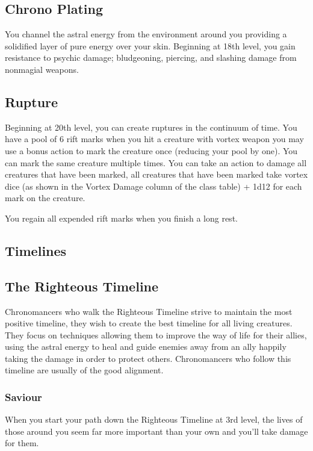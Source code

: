 \subsection{Chrono Plating}

You channel the astral energy from the environment around you providing a solidified layer of pure energy over your skin. Beginning at 18th level, you gain resistance to psychic damage; bludgeoning, piercing, and slashing damage from nonmagial weapons.

\subsection{Rupture}

Beginning at 20th level, you can create ruptures in the continuum of time. You have a pool of 6 rift marks when you hit a creature with vortex weapon you may use a bonus action to mark the creature once (reducing your pool by one). You can mark the same creature multiple times. You can take an action to damage all creatures that have been marked, all creatures that have been marked take vortex dice (as shown in the Vortex Damage column of the class table) + 1d12 for each mark on the creature.

You regain all expended rift marks when you finish a long rest.

\subsection{Timelines}

\subsection{The Righteous Timeline}

Chronomancers who walk the Righteous Timeline strive to maintain the most positive timeline, they wish to create the best timeline for all living creatures. They focus on techniques allowing them to improve the way of life for their allies, using the astral energy to heal and guide enemies away from an ally happily taking the damage in order to protect others. Chronomancers who follow this timeline are usually of the good alignment.

\subsubsection{Saviour}

When you start your path down the Righteous Timeline at 3rd level, the lives of those around you seem far more important than your own and you'll take damage for them.

